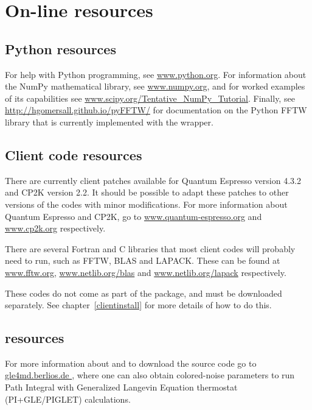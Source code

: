 \documentclass[11pt,english,fleqn]{report}
\begin{document}
\section{On-line resources}


\subsection{Python resources}

For help with Python programming, see \url{www.python.org}. For information
about the NumPy mathematical library, see \url{www.numpy.org}, and
for worked examples of its capabilities see \url{www.scipy.org/Tentative_NumPy_Tutorial}.
Finally, see \url{http://hgomersall.github.io/pyFFTW/} for documentation
on the Python FFTW library that is currently implemented with the
wrapper.


\subsection{Client code resources}

\label{librarywebsites}

There are currently client patches available for Quantum Espresso version
4.3.2 and CP2K version 2.2. It should be possible to adapt these patches
to other versions of the codes with minor modifications. For more
information about Quantum Espresso and CP2K, go to \url{www.quantum-espresso.org}
and \url{www.cp2k.org} respectively.

There are several Fortran and C libraries that most client codes will
probably need to run, such as FFTW, BLAS and LAPACK. These can be
found at \url{www.fftw.org}, \url{www.netlib.org/blas} and \url{www.netlib.org/lapack}
respectively.

These codes do not come as part of the \ipi package, and must be
downloaded separately. See chapter~\ref{clientinstall} for more details
of how to do this. 


\subsection{\ipi resources}

For more information about \ipi{} and to download the source code
go to \url{gle4md.berlios.de }, where one can also obtain colored-noise
parameters to run Path Integral with Generalized Langevin Equation
thermostat (PI+GLE/PIGLET) calculations.

\end{document}
